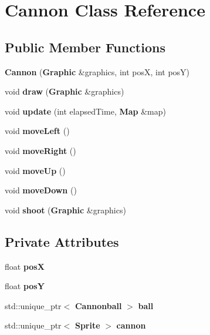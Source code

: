 \section{Cannon Class Reference}
\label{class_cannon}
\subsection*{Public Member Functions}
\begin{DoxyCompactItemize}
\item 
{\bfseries Cannon} ({\bf Graphic} \&graphics, int pos\+X, int pos\+Y)\label{class_cannon_a7dc46cea020d9360ce939f5eed18604f}

\item 
void {\bfseries draw} ({\bf Graphic} \&graphics)\label{class_cannon_adc9351fb66c450f50e1ebb71a17ab101}

\item 
void {\bfseries update} (int elapsed\+Time, {\bf Map} \&map)\label{class_cannon_ace63d1bb033c544019f570fcc6d34751}

\item 
void {\bfseries move\+Left} ()\label{class_cannon_a52cda8f88ae6a3bd6220dcaf7f35e275}

\item 
void {\bfseries move\+Right} ()\label{class_cannon_af6c1e5ba6193fd4e4e9c74c8306fa01d}

\item 
void {\bfseries move\+Up} ()\label{class_cannon_a794ccd790953d7a565489a679427a98a}

\item 
void {\bfseries move\+Down} ()\label{class_cannon_aaaab504200dc7755b4a1088646f8c8d6}

\item 
void {\bfseries shoot} ({\bf Graphic} \&graphics)\label{class_cannon_acd07d0e39e049745e8d146a7be1ccf33}

\end{DoxyCompactItemize}
\subsection*{Private Attributes}
\begin{DoxyCompactItemize}
\item 
float {\bfseries pos\+X}\label{class_cannon_a5915116075945ec3928ebf3745f517c7}

\item 
float {\bfseries pos\+Y}\label{class_cannon_a6790466c3b6b779e0d2e0909728decf6}

\item 
std\+::unique\+\_\+ptr$<$ {\bf Cannonball} $>$ {\bfseries ball}\label{class_cannon_a621a4bcec5b09bcc5cfd783439a85e0c}

\item 
std\+::unique\+\_\+ptr$<$ {\bf Sprite} $>$ {\bfseries cannon}\label{class_cannon_a62290a4217593ea492caab58878c4c2d}

\end{DoxyCompactItemize}


